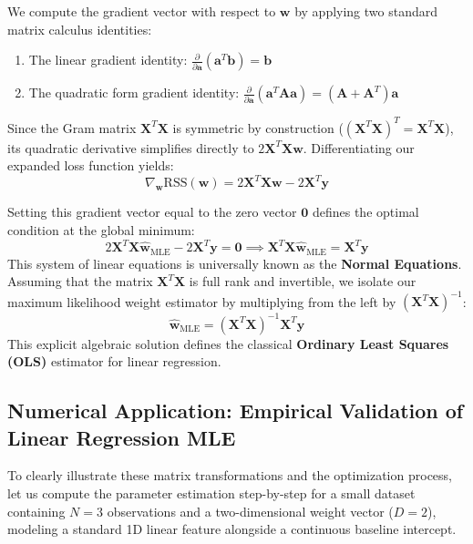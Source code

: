 \documentclass{article}
\begin{document}
We compute the gradient vector with respect to $\mathbf{w}$ by applying two standard matrix calculus identities:
\begin{enumerate}
    \item The linear gradient identity: $\frac{\partial}{\partial \mathbf{a}} (\mathbf{a}^T \mathbf{b}) = \mathbf{b}$
    \item The quadratic form gradient identity: $\frac{\partial}{\partial \mathbf{a}} (\mathbf{a}^T \mathbf{\mathbf{A}} \mathbf{a}) = (\mathbf{\mathbf{A}} + \mathbf{\mathbf{A}}^T)\mathbf{a}$
\end{enumerate}
Since the Gram matrix $\mathbf{X}^T \mathbf{X}$ is symmetric by construction ($(\mathbf{X}^T\mathbf{X})^T = \mathbf{X}^T\mathbf{X}$), its quadratic derivative simplifies directly to $2\mathbf{X}^T\mathbf{X}\mathbf{w}$. Differentiating our expanded loss function yields:
\begin{equation}
\nabla_{\mathbf{w}} \text{RSS}(\mathbf{w}) = 2\mathbf{X}^T \mathbf{X} \mathbf{w} - 2\mathbf{X}^T \mathbf{y}
\end{equation}

Setting this gradient vector equal to the zero vector $\mathbf{0}$ defines the optimal condition at the global minimum:
\begin{equation}
2\mathbf{X}^T \mathbf{X} \hat{\mathbf{w}}_{\text{MLE}} - 2\mathbf{X}^T \mathbf{y} = \mathbf{0} \implies \mathbf{X}^T \mathbf{X} \hat{\mathbf{w}}_{\text{MLE}} = \mathbf{X}^T \mathbf{y}
\end{equation}
This system of linear equations is universally known as the \textbf{Normal Equations}. Assuming that the matrix $\mathbf{X}^T \mathbf{X}$ is full rank and invertible, we isolate our maximum likelihood weight estimator by multiplying from the left by $(\mathbf{X}^T \mathbf{X})^{-1}$:
\begin{equation}
\hat{\mathbf{w}}_{\text{MLE}} = \left(\mathbf{X}^T \mathbf{X}\right)^{-1} \mathbf{X}^T \mathbf{y}
\end{equation}
This explicit algebraic solution defines the classical \textbf{Ordinary Least Squares (OLS)} estimator for linear regression.

\subsection{Numerical Application: Empirical Validation of Linear Regression MLE}

To clearly illustrate these matrix transformations and the optimization process, let us compute the parameter estimation step-by-step for a small dataset containing $N = 3$ observations and a two-dimensional weight vector ($D = 2$), modeling a standard 1D linear feature alongside a continuous baseline intercept.
\end{document}
